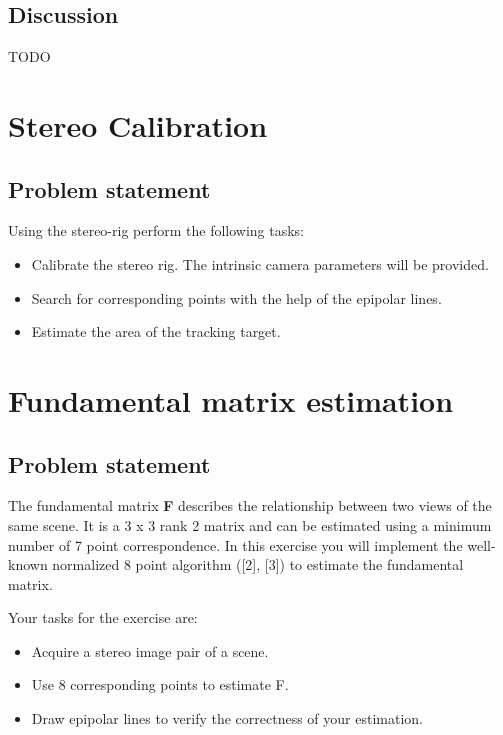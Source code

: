 \documentclass[
a4paper,     %
11pt         %
]{scrartcl}  %
\begin{document}
\subsection{Discussion}
{ \color{red} TODO }

\FloatBarrier
\section{Stereo Calibration}

\subsection{Problem statement}

Using the stereo-rig perform the following tasks:

\begin{itemize}
 \item Calibrate the stereo rig. The intrinsic camera parameters will be provided.
 \item Search for corresponding points with the help of the epipolar lines.
 \item Estimate the area of the tracking target.
\end{itemize}

\newpage
\section{Fundamental matrix estimation}

\subsection{Problem statement}

The fundamental matrix \textbf{F} describes the relationship between two views of the same scene. It is a 3 x 3 rank
2 matrix and can be estimated using a minimum number of 7 point correspondence. In this exercise you will
implement the well-known normalized 8 point algorithm ([2], [3]) to estimate the fundamental matrix.

Your tasks for the exercise are:
\begin{itemize}
    \item Acquire a stereo image pair of a scene.
    \item Use 8 corresponding points to estimate F.
    \item Draw epipolar lines to verify the correctness of your estimation.
\end{itemize}
\end{document}
